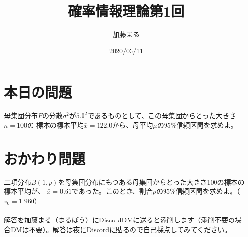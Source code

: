 \documentclass[a4j,uplatex,dvipdfmx]{jsarticle}
\title{確率情報理論第1回}
\author{加藤まる}
\date{2020/03/11}
\begin{document}
\maketitle

\section*{本日の問題}
母集団分布$F$の分散$\sigma ^2$が$5.0^2$であるものとして、この母集団からとった大きさ$n=100$の
標本の標本平均$\bar{x}=122.0$から、母平均$\mu$の$95\%$信頼区間を求めよ。


\section*{おかわり問題}
二項分布$B(1,p)$を母集団分布にもつある母集団からとった大きさ100の標本の標本平均が、
$\bar{x}=0.61$であった。このとき、割合$p$の$95 \%$信頼区間を求めよ。（$z_0 =1.960$）\\
\\
解答を加藤まる（まるぼう）にDiscordDMに送ると添削します（添削不要の場合DMは不要）。解答は夜にDiscordに貼るので自己採点してみてください。
\end{document}
